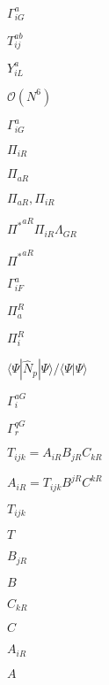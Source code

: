 \documentclass{article}
\begin{document}
$\Gamma^a_{iG}$
\pagebreak

$T_{ij}^{ab}$
\pagebreak

$Y^a_{iL}$
\pagebreak

$ \mathcal{O}(N^{6}) $
\pagebreak

$\Gamma_{iG}^a$
\pagebreak

$\Pi_{iR}$
\pagebreak

$\Pi_{aR}$
\pagebreak

$\Pi_{aR},\Pi_{iR}$
\pagebreak

${\Pi^\ast}^{aR}\Pi_{iR}\Lambda_{GR}$
\pagebreak

${\Pi^\ast}^{aR}$
\pagebreak

$\Gamma^a_{iF}$
\pagebreak

$\Pi^R_a$
\pagebreak

$\Pi^R_i$
\pagebreak

$\langle\Psi|\hat N_p|\Psi\rangle/\langle\Psi|\Psi\rangle$
\pagebreak

$\Gamma^{aG}_i$
\pagebreak

$\Gamma^{qG}_r$
\pagebreak

$T_{ijk}=A_{iR}B_{jR}C_{kR}$
\pagebreak

$A_{iR} = T_{ijk}B^{jR}C^{kR}$
\pagebreak

$T_{ijk}$
\pagebreak

$T$
\pagebreak

$B_{jR}$
\pagebreak

$B$
\pagebreak

$C_{kR}$
\pagebreak

$C$
\pagebreak

$A_{iR}$
\pagebreak

$A$
\pagebreak
\end{document}
